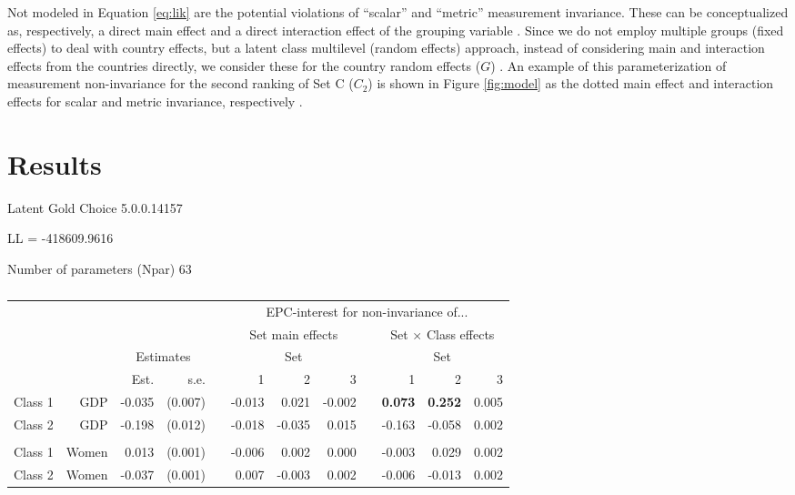 \documentclass[letterpaper,12pt]{article}
\begin{document}
Not modeled in Equation \ref{eq:lik} are the potential violations of 
``scalar''  and ``metric'' measurement invariance. These can be conceptualized as, respectively, a direct main effect and a direct interaction effect of the grouping variable 
\citep{mellenbergh1989item,kankaras2010testing,kankaras2011measurement}. Since we do not employ multiple groups (fixed effects) to deal with country effects, but a latent class multilevel (random effects) approach, instead of considering main and interaction effects from the countries directly, we consider these for the country random effects ($G$)  \citep[see][for applications in multilevel IRT]{dejong2007relaxing,fox2011random}.
An example of this parameterization of measurement non-invariance for 
the second ranking of Set C ($C_2$) is shown in Figure \ref{fig:model} as the dotted main effect and interaction effects for scalar and metric invariance, respectively . 






\section{Results}

Latent Gold Choice 5.0.0.14157
\citep{vermunt2005lgchoice,vermunt2013technical}

LL = -418609.9616

Number of parameters (Npar)	63


\begin{table}
	\begin{tabular}{lrrrrrrrrrrr}
	\hline
		&&&&&\multicolumn{7}{c}{EPC-interest for non-invariance of...}\\
	&&&&&\multicolumn{3}{c}{Set main effects} && \multicolumn{3}{c}{Set $\times$ Class effects}\\
			\hline
		&&\multicolumn{2}{c}{Estimates}&&\multicolumn{3}{c}{Set} && \multicolumn{3}{c}{Set}\\
\cline{3-4}\cline{6-8}\cline{10-12}
			&	&	Est.&	s.e.&	&	1  &	2  &	3  &&	  1&	2 &	3\\
				\hline
Class	1&	GDP&	-0.035&	(0.007)&	&	-0.013&	0.021&	-0.002&&	\textbf{0.073}&	\textbf{0.252}&	0.005\\
Class	2&	GDP&	-0.198&	(0.012)&	&	-0.018&	-0.035&	0.015&&	-0.163&	-0.058&	0.002\\
\\
Class	1&	Women&	0.013&	(0.001)&	&	-0.006&	0.002&	0.000&&	-0.003&	0.029&	0.002\\
Class	2&	Women&	-0.037&	(0.001)&	&	0.007&	-0.003&	0.002&&	-0.006&	-0.013&	0.002\\
	\hline
\end{tabular}
	\caption{\label{tab:epc-interest-model1}}
\end{table}
\end{document}
